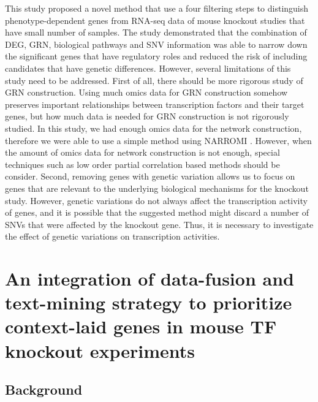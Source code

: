 \documentclass[oneside,phd]{snuthesis}
\begin{document}
This study proposed a novel method that use a four filtering steps to distinguish phenotype-dependent genes from RNA-seq data of mouse knockout studies that have small number of samples. 
The study demonstrated that the combination of DEG, GRN, biological pathways
and SNV information was able to narrow down the significant genes that have regulatory roles and reduced the risk of including candidates that have genetic differences.
However, several limitations of this study need to be addressed.
First of all, there should be more rigorous study of GRN construction. 
Using much omics data for GRN construction somehow preserves important relationships between transcription factors and their target genes, but how much data is needed for GRN construction is not rigorously studied. 
In this study, we had enough omics data for the network construction, therefore we were able to use a simple method using NARROMI \citep{zhang2012narromi}.
However, when the amount of omics data for network construction is not enough, special techniques such as low order partial correlation based methods \citep{zuo2014biological} should be consider.
Second, removing genes with genetic variation allows us to focus on genes that are relevant to the underlying biological mechanisms for the knockout study. 
However, genetic variations do not always affect the transcription activity of genes, and it is possible that the suggested method might discard a number of SNVs that were affected by the knockout gene.
Thus, it is necessary to investigate the effect of genetic variations on transcription activities.



\chapter{An integration of data-fusion and text-mining strategy to prioritize context-laid genes in mouse TF knockout experiments}

\section{Background}
\end{document}

